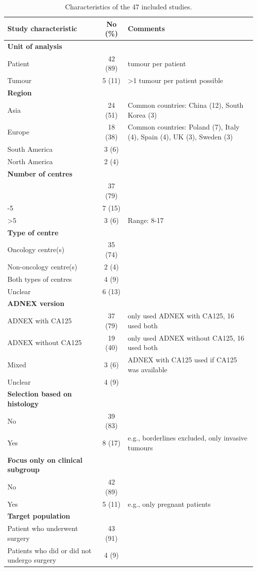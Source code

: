  \begin{table}[h!]
\small
\centering
\caption{Characteristics of the 47 included studies.}
\label{tab:1}
\begin{tabularx}{\linewidth}{l c >{\raggedright\arraybackslash}X}
\toprule
\textbf{Study characteristic} & \textbf{No (\%)} & \textbf{Comments} \\ 
\midrule
\textbf{Unit of analysis} & & \\
\quad Patient & 42 (89) & 1 tumour per patient \\
\quad Tumour & 5 (11) & >1 tumour per patient possible \\
\addlinespace
\textbf{Region} & & \\
\quad Asia & 24 (51) & Common countries: China (12), South Korea (3) \\
\quad Europe & 18 (38) & Common countries: Poland (7), Italy (4), Spain (4), UK (3), Sweden (3) \\
\quad South America & 3 (6) & \\
\quad North America & 2 (4) & \\
\addlinespace
\textbf{Number of centres} & & \\
\quad 1 & 37 (79) & \\
\quad 2-5 & 7 (15) & \\
\quad >5 & 3 (6) & Range: 8-17 \\
\addlinespace
\textbf{Type of centre} & & \\
\quad Oncology centre(s) & 35 (74) & \\
\quad Non-oncology centre(s) & 2 (4) & \\
\quad Both types of centres & 4 (9) & \\
\quad Unclear & 6 (13) & \\
\addlinespace
\textbf{ADNEX version} & & \\
\quad \gls{ADNEX} with CA125 & 37 (79) & 21 only used \gls{ADNEX} with CA125, 16 used both \\
\quad \gls{ADNEX} without CA125 & 19 (40) & 3 only used \gls{ADNEX} without CA125, 16 used both \\
\quad Mixed & 3 (6) & \gls{ADNEX} with CA125 used if CA125 was available \\
\quad  Unclear & 4 (9) & \\
\addlinespace
\textbf{Selection based on histology} & & \\
\quad No & 39 (83) & \\
\quad Yes & 8 (17) & e.g., borderlines excluded, only invasive tumours \\
\addlinespace
\textbf{Focus only on clinical subgroup} & & \\
\quad No & 42 (89) & \\
\quad Yes & 5 (11) & e.g., only pregnant patients \\
\addlinespace
\textbf{Target population} & & \\
\quad Patient who underwent surgery & 43 (91) & \\
\quad  Patients who did or did not undergo surgery & 4 (9) & \\
\bottomrule
\end{tabularx}
\end{table}


